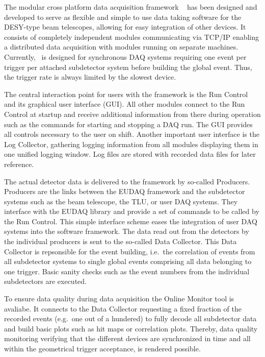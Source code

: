 
The modular cross platform data acquisition framework \eudaq~\cite{ref:eudaqwebsite} has been designed and developed to serve as flexible and simple to use data taking software for the DESY-type beam telescopes,
 allowing for easy integration of other devices. 
It consists of completely independent modules communicating via TCP/IP enabling a distributed data acquisition with modules running on separate machines. 
Currently, \eudaq\ is designed for synchronous DAQ systems requiring one event per trigger per attached subdetector system before building the global event. 
Thus, the trigger rate is always limited by the slowest device.

The central interaction point for users with the framework is the Run Control and its graphical user interface (GUI). 
All other modules connect to the Run Control at startup and receive additional information from there during operation such as the commands for starting and stopping a DAQ run. 
The GUI provides all controls necessary to the user on shift. 
Another important user interface is the Log Collector, gathering logging information from all modules displaying them in one unified logging window. 
Log files are stored with recorded data files for later reference.

The actual detector data is delivered to the framework by so-called Producers.
Producers are the links between the EUDAQ framework and the subdetector systems such as the beam telescope, the TLU, or user DAQ systems.
They interface with the EUDAQ library and provide a set of commands to be called by the Run Control. 
This simple interface scheme eases the integration of user DAQ systems into the software framework.
The data read out from the detectors by the individual producers is sent to the so-called Data Collector. 
This Data Collector is repsonsible for the event building, i.e.\ the correlation of events from all subdetector systems to single global events comprising all data belonging to one trigger. 
Basic sanity checks such as the event numbers from the individual subdetectors are executed.

To ensure data quality during data acquisition the Online Monitor tool is avaliabe. 
It connects to the Data Collector requesting a fixed fraction of the recorded events (e.g.\ one out of a hundered) to fully decode all subdetector data
 and build basic plots such as hit maps or correlation plots.
Thereby, data quality monitoring verifying that the different devices are synchronized in time and all within the geometrical trigger acceptance, is rendered possible.

